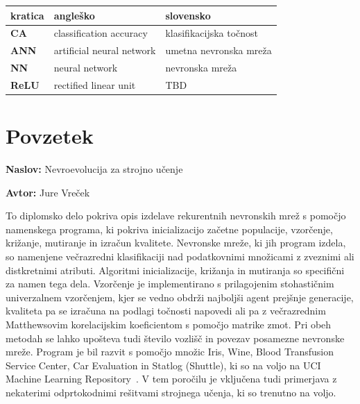 \documentclass[a4paper,12pt,openright]{book}
\newcommand{\ttitle}{Nevroevolucija za strojno učenje}
\newcommand{\tauthor}{Jure Vreček}
\newcommand{\clearemptydoublepage}{\newpage{\pagestyle{empty}\cleardoublepage}}
\begin{document}
    \noindent\begin{tabular}{p{}|p{}|p{}}    %
    \textbf{kratica}
                 & \textbf{angleško}             & \textbf{slovensko}                        \\ \hline
                 \textbf{CA}    &   classification accuracy &   klasifikacijska točnost \\
                 \textbf{ANN}   &   artificial neural network   &   umetna nevronska mreža \\
                 \textbf{NN}    &   neural network    & nevronska mreža \\
                 \textbf{ReLU}    &   rectified linear unit    & TBD \\
    \end{tabular}



    \clearemptydoublepage

    \chapter*{Povzetek}

    \noindent\textbf{Naslov:} \ttitle
    \bigskip

    \noindent\textbf{Avtor:} \tauthor
    \bigskip

    \noindent To diplomsko delo pokriva opis izdelave rekurentnih nevronskih mrež s pomočjo namenskega programa, ki
    pokriva inicializacijo začetne populacije, vzorčenje, križanje, mutiranje in izračun kvalitete.
    Nevronske mreže, ki jih program izdela, so namenjene večrazredni klasifikaciji nad podatkovnimi množicami z zveznimi ali distkretnimi atributi.
    Algoritmi inicializacije, križanja in mutiranja so specifični za namen tega dela.
    Vzorčenje je implementirano s prilagojenim stohastičnim univerzalnem vzorčenjem, kjer se vedno obdrži najboljši agent prejšnje
    generacije, kvaliteta pa se izračuna na podlagi točnosti napovedi ali pa z večrazrednim Matthewsovim korelacijskim koeficientom s pomočjo matrike zmot.
    Pri obeh metodah se lahko upošteva tudi število vozlišč in povezav posamezne nevronske mreže.
    Program je bil razvit s pomočjo množic Iris, Wine, Blood Transfusion Service Center, Car Evaluation in Statlog (Shuttle), ki so
    na voljo na UCI Machine Learning Repository~\cite{Dua:2019}.
    V tem poročilu je vključena tudi primerjava z nekaterimi odprtokodnimi rešitvami strojnega učenja, ki so trenutno na voljo.
\end{document}
